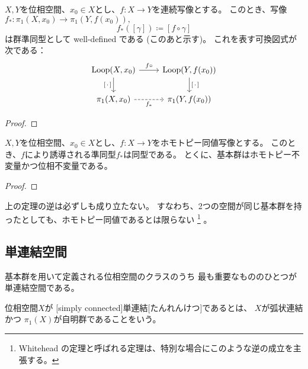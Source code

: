 \documentclass[report]{jlreq}
\begin{document}
\begin{definition}[連続写像により誘導される準同型]
    $X, Y$を位相空間、$x_0 \in X$とし、$f \colon X \to Y$を連続写像とする。
    このとき、写像$f_* \colon \pi_1(X, x_0) \to \pi_1(Y, f(x_0)),$
    \begin{equation}
        f_*([\gamma]) \coloneqq [f \circ \gamma]
    \end{equation}
    は群準同型として well-defined である (このあと示す)。
    これを表す可換図式が次である：
    \begin{equation}
        \begin{tikzcd}
            \mathrm{Loop}(X, x_0) \ar{r}{f \circ} \ar{d}[swap]{[\,\cdot\,]}
                & \mathrm{Loop}(Y, f(x_0)) \ar{d}{[\,\cdot\,]} \\
            \pi_1(X, x_0) \ar[dashed]{r}[swap]{f_*} & \pi_1(Y, f(x_0))
        \end{tikzcd}
    \end{equation}
\end{definition}

\begin{proof}
    \TODO{}
\end{proof}

\begin{theorem}[基本群はホモトピー不変量]
    $X, Y$を位相空間、$x_0 \in X$とし、$f \colon X \to Y$をホモトピー同値写像とする。
    このとき、$f$により誘導される準同型$f_*$は同型である。
    とくに、基本群はホモトピー不変量かつ位相不変量である。
\end{theorem}

\begin{proof}
    \TODO{}
\end{proof}

\begin{remark}[基本群の一致はホモトピー同値を意味しない]
    上の定理の逆は必ずしも成り立たない。
    すなわち、2つの空間が同じ基本群を持ったとしても、ホモトピー同値であるとは限らない
    \footnote{
        Whitehead の定理と呼ばれる定理は、特別な場合にこのような逆の成立を主張する。
    }
    。
\end{remark}

\subsection{単連結空間}

基本群を用いて定義される位相空間のクラスのうち
最も重要なもののひとつが単連結空間である。

\begin{definition}[単連結]
    位相空間$X$が
    [simply connected]{単連結}[たんれんけつ]であるとは、
    $X$が弧状連結かつ
    $\pi_1(X)$が自明群であることをいう。
\end{definition}
\end{document}
